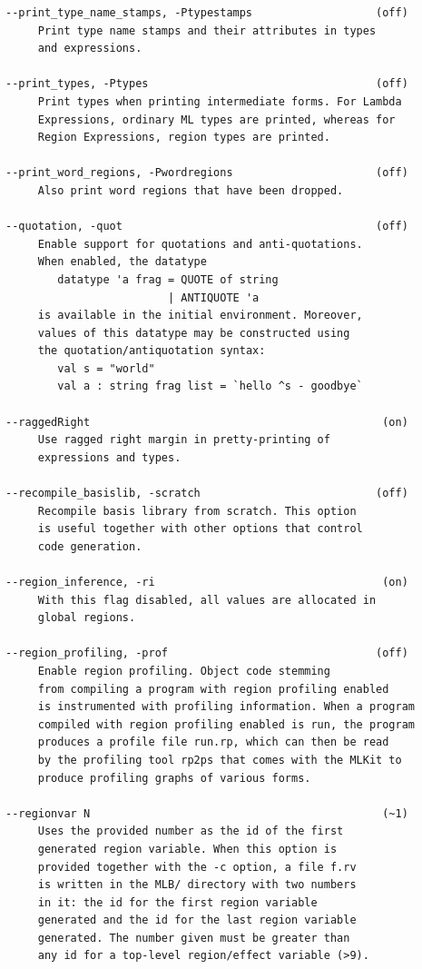 \documentclass[12pt]{book}
\begin{document}
\begin{verbatim}
--print_type_name_stamps, -Ptypestamps                   (off)
     Print type name stamps and their attributes in types
     and expressions.

--print_types, -Ptypes                                   (off)
     Print types when printing intermediate forms. For Lambda
     Expressions, ordinary ML types are printed, whereas for
     Region Expressions, region types are printed.

--print_word_regions, -Pwordregions                      (off)
     Also print word regions that have been dropped.

--quotation, -quot                                       (off)
     Enable support for quotations and anti-quotations.
     When enabled, the datatype
        datatype 'a frag = QUOTE of string
                         | ANTIQUOTE 'a
     is available in the initial environment. Moreover,
     values of this datatype may be constructed using
     the quotation/antiquotation syntax:
        val s = "world" 
        val a : string frag list = `hello ^s - goodbye`

--raggedRight                                             (on)
     Use ragged right margin in pretty-printing of
     expressions and types.

--recompile_basislib, -scratch                           (off)
     Recompile basis library from scratch. This option
     is useful together with other options that control
     code generation.

--region_inference, -ri                                   (on)
     With this flag disabled, all values are allocated in
     global regions.

--region_profiling, -prof                                (off)
     Enable region profiling. Object code stemming
     from compiling a program with region profiling enabled
     is instrumented with profiling information. When a program
     compiled with region profiling enabled is run, the program
     produces a profile file run.rp, which can then be read
     by the profiling tool rp2ps that comes with the MLKit to
     produce profiling graphs of various forms.

--regionvar N                                             (~1)
     Uses the provided number as the id of the first
     generated region variable. When this option is
     provided together with the -c option, a file f.rv
     is written in the MLB/ directory with two numbers
     in it: the id for the first region variable
     generated and the id for the last region variable
     generated. The number given must be greater than
     any id for a top-level region/effect variable (>9).


\end{verbatim}
\end{document}
